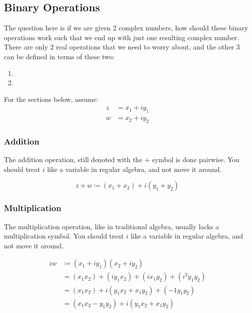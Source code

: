 \subsection{Binary Operations}\label{subsec:Binary_Operations}
The question here is if we are given 2 complex numbers, how should these binary operations work such that we end up with just one resulting complex number.
There are only 2 real operations that we need to worry about, and the other 3 can be defined in terms of these two:
\begin{enumerate}[noitemsep]
\item {}
\item {}
\end{enumerate}

For the sections below, assume:
\begin{align*}
  z &= x_{1} + iy_{1} \\
  w &= x_{2} + iy_{2}
\end{align*}

\subsubsection{Addition}\label{subsubsec:Complex_Number-Addition}
The addition operation, still denoted with the $+$ symbol is done pairwise.
You should treat $i$ like a variable in regular algebra, and not move it around.

\begin{equation}\label{eq:Complex_Number-Addition}
  z+w \coloneqq (x_{1}+x_{2}) + i(y_{1}+y_{2})
\end{equation}

\subsubsection{Multiplication}\label{subsubsec:Complex_Number-Multiplication}
The multiplication operation, like in traditional algebra, usually lacks a multiplication symbol.
You should treat $i$ like a variable in regular algebra, and not move it around.

\begin{equation}\label{eq:Complex_Number-Multiplication}
  \begin{aligned}
    zw &\coloneqq (x_{1} + iy_{1}) (x_{2} + iy_{2}) \\
    &= (x_{1}x_{2}) + (iy_{1}x_{2}) + (ix_{1}y_{2}) + (i^{2}y_{1}y_{2}) \\
    &= (x_{1}x_{2}) + i(y_{1}x_{2} + x_{1}y_{2}) + (-1 y_{1}y_{2}) \\
    &= (x_{1}x_{2} - y_{1}y_{2}) + i(y_{1}x_{2} + x_{1}y_{2}) \\
  \end{aligned}
\end{equation}

